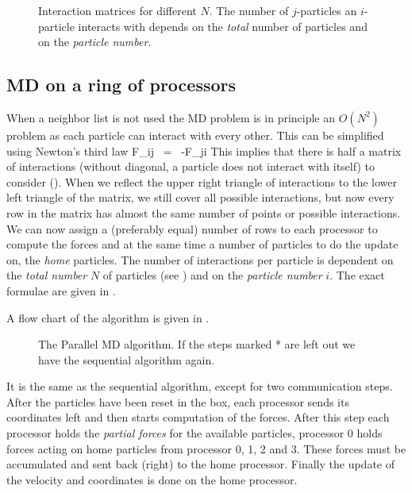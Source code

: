 \begin{figure}[p]
\centerline{}
\caption[Interaction matrices for different $N$.]{Interaction matrices for different $N$. The number of $j$-particles an $i$-particle interacts with depends on the {\em total} number of particles and on the {\em particle number}.}
\label{fig:decomp}
\end{figure}

\subsection{MD on a ring of processors}
When a neighbor list is not used the MD problem is in principle an $O(N^2)$ 
problem as each particle can interact
with every other. This can be simplified using Newton's third law
\beq
F_{ij}  ~=~     -F_{ji}
\label{eqn:Newt3}
\eeq
This implies that there is half a matrix of interactions (without diagonal, 
a particle does not interact with itself) to consider ().
When we reflect the upper right triangle of interactions to the lower
left triangle of the matrix, we still cover all possible interactions,
but now every row in the matrix has almost the same number of points
or possible interactions.  We can now assign a (preferably equal)
number of rows to each processor to compute the forces and at the same
time a number of particles to do the update on, the {\em home}
particles. The number of interactions per particle is dependent on the
{\em total number} $N$ of particles (see ) and on the
{\em particle number} $i$.  The exact formulae are given in
.

A flow chart of the algorithm is given in .
\begin{figure}
\centerline{}
\caption[The Parallel MD algorithm.]{The Parallel MD algorithm. If
the steps marked * are left out we have the sequential algorithm
again.}
\label{fig:mdpar}
\end{figure}
It is the same as the sequential algorithm, except for two
communication steps. After the particles have been reset in the box,
each processor sends its coordinates left and then starts computation
of the forces.  After this step each processor holds the {\em partial
forces} for the available particles, {\eg} processor 0 holds forces
acting on home particles from processor 0, 1, 2 and 3. These forces
must be accumulated and sent back (right) to the home
processor. Finally the update of the velocity and coordinates is done
on the home processor.

